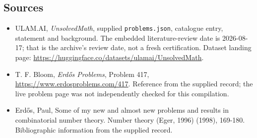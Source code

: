 \documentclass[11pt,a4paper]{article}
\begin{document}
\subsection{Sources}

{\small

\begin{itemize}

\item[\hypertarget{source:statement:1}{S1}] ULAM.AI, \emph{UnsolvedMath}, supplied \texttt{problems.json}, catalogue entry, statement and background. The embedded literature-review date is 2026-08-17; that is the archive’s review date, not a fresh certification. Dataset landing page: \url{https://huggingface.co/datasets/ulamai/UnsolvedMath}.

\item[\hypertarget{source:statement:2}{S2}] T. F. Bloom, \emph{Erdős Problems}, Problem 417, \url{https://www.erdosproblems.com/417}. Reference from the supplied record; the live problem page was not independently checked for this compilation.

\item[\hypertarget{source:statement:3}{S3}] Erd\H{o}s, Paul, Some of my new and almost new problems and results in combinatorial number theory. Number theory (Eger, 1996) (1998), 169-180. Bibliographic information from the supplied record.

\end{itemize}

}

\label{end:statement}
\end{document}
